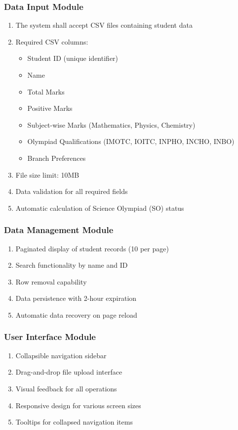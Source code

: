 \documentclass[12pt]{article}
\begin{document}
\subsubsection{Data Input Module}
\begin{enumerate}[label=FR\arabic*.]
    \item The system shall accept CSV files containing student data
    \item Required CSV columns:
    \begin{itemize}
        \item Student ID (unique identifier)
        \item Name
        \item Total Marks
        \item Positive Marks
        \item Subject-wise Marks (Mathematics, Physics, Chemistry)
        \item Olympiad Qualifications (IMOTC, IOITC, INPHO, INCHO, INBO)
        \item Branch Preferences
    \end{itemize}
    \item File size limit: 10MB
    \item Data validation for all required fields
    \item Automatic calculation of Science Olympiad (SO) status
\end{enumerate}

\subsubsection{Data Management Module}
\begin{enumerate}[label=FR\arabic*., start=6]
    \item Paginated display of student records (10 per page)
    \item Search functionality by name and ID
    \item Row removal capability
    \item Data persistence with 2-hour expiration
    \item Automatic data recovery on page reload
\end{enumerate}

\subsubsection{User Interface Module}
\begin{enumerate}[label=FR\arabic*., start=11]
    \item Collapsible navigation sidebar
    \item Drag-and-drop file upload interface
    \item Visual feedback for all operations
    \item Responsive design for various screen sizes
    \item Tooltips for collapsed navigation items
\end{enumerate}
\end{document}
